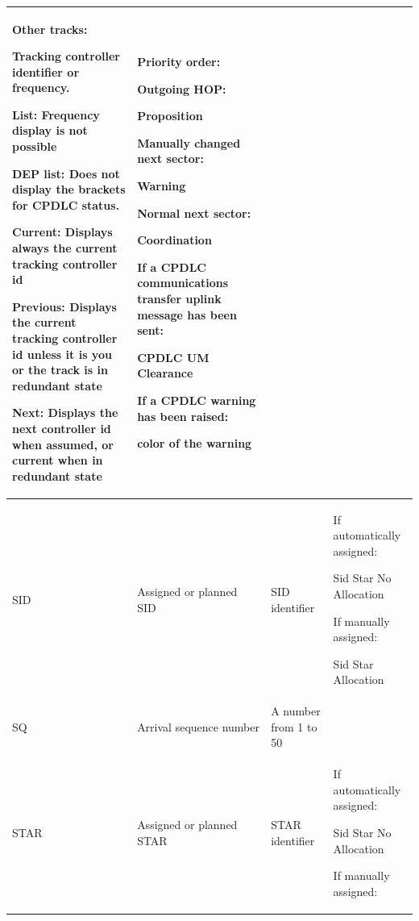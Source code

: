 \documentclass[11pt,a4paper]{memoir}
\begin{document}
\begin{longtable}{|p{2.5cm}|p{2.5cm}|p{4.5cm}|p{4.5cm}|}
      Other tracks: 
      
      Tracking controller identifier or  frequency. 
      \bigskip
      
      List: Frequency display is not possible 
      \bigskip
      
      DEP list: Does not display the  brackets for CPDLC status. 
      \bigskip
      
      Current: Displays always the  current tracking controller id 
      \bigskip
      
      Previous: Displays the current tracking controller id unless it is you or the track is in redundant state 
      \bigskip
      
      Next: Displays the next controller id when assumed, or current when in redundant state &
      Priority order: 
      \bigskip
      
      Outgoing HOP: 
      
      Proposition 
      \bigskip
      
      Manually changed next sector: 
      
      Warning 
      \bigskip
      
      Normal next sector:
      
      Coordination 
      \bigskip
      
      If a CPDLC communications transfer uplink message has been sent:  
      
      CPDLC UM Clearance 
      \bigskip
      
      If a CPDLC warning has been raised: 
      
      color of the  warning \\ \hline
    SID &
      Assigned or planned SID &
      SID identifier &
      If automatically assigned:  
      
      Sid Star No Allocation 
      \bigskip
      
      If manually assigned: 
      
      Sid Star Allocation \\ \hline
    SQ &
      Arrival sequence number &
      A number from 1 to 50 &
       \\ \hline
    STAR &
      Assigned or planned STAR &
      STAR identifier &
      If automatically assigned:  
      
      Sid Star No Allocation 
      \bigskip
      
      If manually assigned: 
      

\end{longtable}
\end{document}
